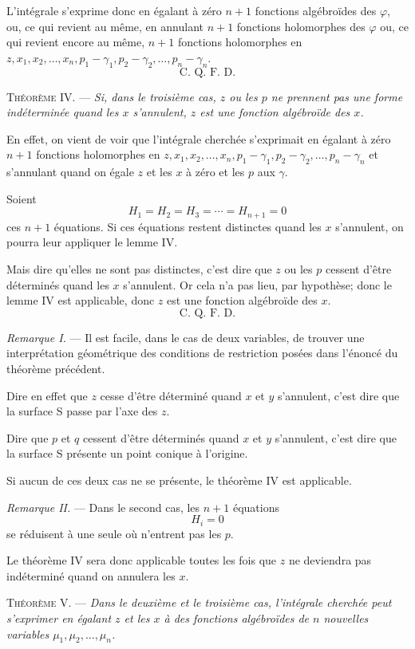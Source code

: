\documentclass[11pt]{article}
\begin{document}
L’intégrale s’exprime donc en égalant à zéro $n+1$ fonctions algébroïdes des $\varphi$, ou, ce qui revient au même, en annulant $n+1$ fonctions holomorphes des $\varphi$ ou, ce qui revient encore au même, $n+1$ fonctions holomorphes en $z,x_1,x_2,\ldots,x_n,p_1-\gamma_1,p_2-\gamma_2,\ldots,p_n-\gamma_n$.
\[
\text{C. Q. F. D.}
\]

\medskip
\noindent\textsc{Théorème IV.} — \emph{Si, dans le troisième cas, $z$ ou les $p$ ne prennent pas une forme indéterminée quand les $x$ s’annulent, $z$ est une fonction algébroïde des $x$.}

En effet, on vient de voir que l’intégrale cherchée s’exprimait en égalant à zéro $n+1$ fonctions holomorphes en $z,x_1,x_2,\ldots,x_n,p_1-\gamma_1,p_2-\gamma_2,\ldots,p_n-\gamma_n$ et s’annulant quand on égale $z$ et les $x$ à zéro et les $p$ aux $\gamma$.

Soient
\[
H_1=H_2=H_3=\cdots=H_{n+1}=0
\]
ces $n+1$ équations. Si ces équations restent distinctes quand les $x$ s’annulent, on pourra leur appliquer le lemme IV.

Mais dire qu’elles ne sont pas distinctes, c’est dire que $z$ ou les $p$ cessent d’être déterminés quand les $x$ s’annulent. Or cela n’a pas lieu, par hypothèse; donc le lemme IV est applicable, donc $z$ est une fonction algébroïde des $x$.
\[
\text{C. Q. F. D.}
\]

\emph{Remarque I.} — Il est facile, dans le cas de deux variables, de trouver une interprétation géométrique des conditions de restriction posées dans l’énoncé du théorème précédent.

Dire en effet que $z$ cesse d’être déterminé quand $x$ et $y$ s’annulent, c’est dire que la surface S passe par l’axe des $z$.

Dire que $p$ et $q$ cessent d’être déterminés quand $x$ et $y$ s’annulent, c’est dire que la surface S présente un point conique à l’origine.

Si aucun de ces deux cas ne se présente, le théorème IV est applicable.

\emph{Remarque II.} — Dans le second cas, les $n+1$ équations
\[
H_i=0
\]
se réduisent à une seule où n’entrent pas les $p$.

Le théorème IV sera donc applicable toutes les fois que $z$ ne deviendra pas indéterminé quand on annulera les $x$.

\medskip
\noindent\textsc{Théorème V.} — \emph{Dans le deuxième et le troisième cas, l’intégrale cherchée peut s’exprimer en égalant $z$ et les $x$ à des fonctions algébroïdes de $n$ nouvelles variables $\mu_1,\mu_2,\ldots,\mu_n$.}
\end{document}
